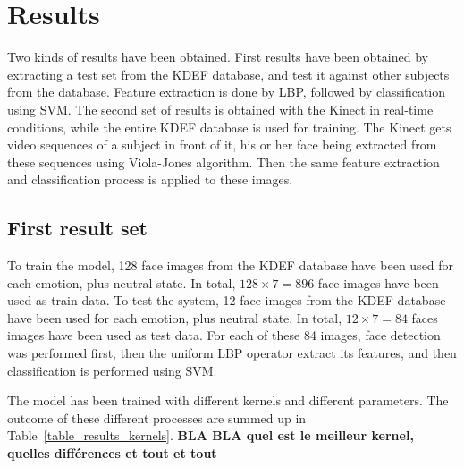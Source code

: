 \chapter{Results}
\label{chap:eval_results}

\noindent Two kinds of results have been obtained. First results have been obtained by extracting a test set from the KDEF database, and test it against other subjects from the database. Feature extraction is done by LBP, followed by classification using SVM. The second set of results is obtained with the Kinect in real-time conditions, while the entire KDEF database is used for training. The Kinect gets video sequences of a subject in front of it, his or her face being extracted from these sequences using Viola-Jones algorithm. Then the same feature extraction and classification process is applied to these images.
\newline

\section{First result set}

\vspace{\baselineskip}
\noindent To train the model, 128 face images from the KDEF database have been used for each emotion, plus neutral state. In total, $ 128\times7 = 896 $ face images have been used as train data. To test the system, 12 face images from the KDEF database have been used for each emotion, plus neutral state. In total, $ 12\times7 = 84 $ faces images have been used as test data. For each of these 84 images, face detection was performed first, then the uniform LBP operator extract its features, and then classification is performed using SVM.
\newline

\noindent The model has been trained with different kernels and different parameters. The outcome of these different processes are summed up in Table~\ref{table_results_kernels}. \textbf{\color{red} BLA BLA quel est le meilleur kernel, quelles différences et tout et tout}
\newline

